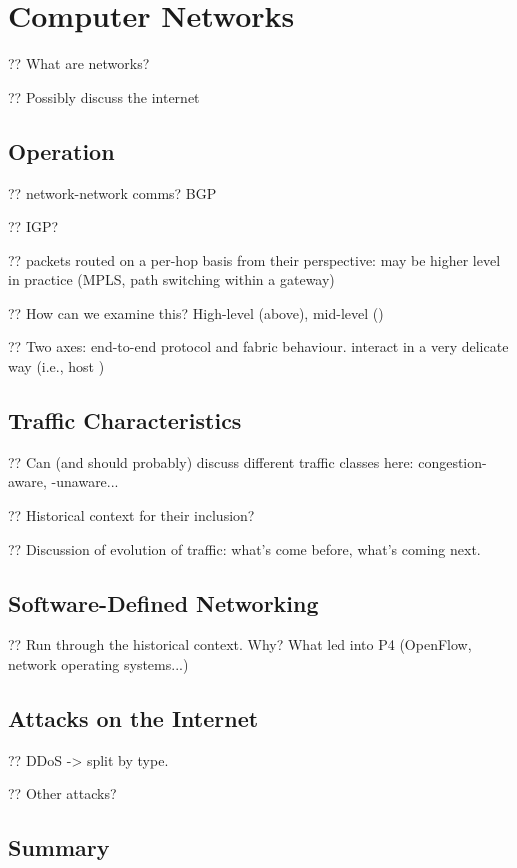 
\chapter{Computer Networks}

?? What are networks?

?? Possibly discuss the internet

\section{Operation}

?? network-network comms? BGP

?? IGP?

?? packets routed on a per-hop basis from their perspective: may be higher level in practice (MPLS, path switching within a gateway)

?? How can we examine this? High-level (above), mid-level ()

?? Two axes: end-to-end protocol and fabric behaviour. interact in a very delicate way (i.e., host )

\section{Traffic Characteristics}

?? Can (and should probably) discuss different traffic classes here: congestion-aware, -unaware...

?? Historical context for their inclusion?

?? Discussion of evolution of traffic: what's come before, what's coming next.

\section{Software-Defined Networking}

?? Run through the historical context. Why? What led into P4 (OpenFlow, network operating systems...)

\section{Attacks on the Internet}

?? DDoS -> split by type.

?? Other attacks?

\section{Summary}


